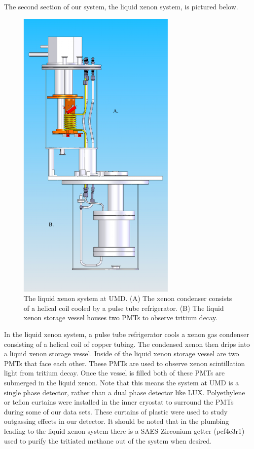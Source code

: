 The second section of our system, the liquid xenon system, is pictured below.

\begin{figure}[h]
\centering
\includegraphics[scale=0.5]{cryo.png}
\caption{The liquid xenon system at UMD. (A) The xenon condenser consists of a helical coil cooled by a pulse tube refrigerator.  (B) The liquid xenon storage vessel houses two PMTs to observe tritium decay.}
\label{fig:Cryo}
\end{figure}


In the liquid xenon system, a pulse tube refrigerator cools a xenon gas condenser consisting of a helical coil of copper tubing.  The condensed xenon then drips into a liquid xenon storage vessel.  Inside of the liquid xenon storage vessel are two PMTs that face each other. These PMTs are used to observe xenon scintillation light from tritium decay. Once the vessel is filled both of these PMTs are submerged in the liquid xenon.  Note that this means the system at UMD is a single phase detector, rather than a dual phase detector like LUX.  Polyethylene or teflon curtains were installed in the inner cryostat to surround the PMTs during some of our data sets.  These curtains of plastic were used to study outgassing effects in our detector.  It should be noted that in the plumbing leading to the liquid xenon system there is a SAES Zirconium getter (pcf4c3r1) used to purify the tritiated methane out of the system when desired.

